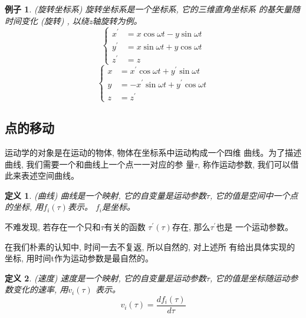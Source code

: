 \documentclass{ctexart}
\numberwithin{equation}{subsection}
\numberwithin{theorem}{subsection}
\newtheorem{definition} {定义}
\numberwithin{definition}{subsection}
\numberwithin{proof}{subsection}
\numberwithin{lemma}{subsection}
\newtheorem{example}    {例子}
\numberwithin{example}{subsection}
\numberwithin{remark}{subsection}
\numberwithin{corollary}{subsection}
\numberwithin{exercise}{subsection}
\numberwithin{problem}{subsection}
\numberwithin{question}{section}
\numberwithin{method}{subsection}
\begin{document}
    \begin{example}
        \label{1.1 ex:rotating frame}
        (旋转坐标系) 旋转坐标系是一个坐标系, 它的三维直角坐标系
        的基矢量随时间变化 (旋转) , 以绕z轴旋转为例。
        \begin{equation}
            \begin{cases}
                x ^ \prime &= x \cos\omega t - y \sin\omega t \\
                y ^ \prime &= x \sin\omega t + y \cos\omega t \\
                z ^ \prime &= z
            \end{cases}
        \end{equation}
        \begin{equation}
            \begin{cases}
                x &= x ^ \prime \cos\omega t + y ^ \prime \sin\omega t \\
                y &= -x ^ \prime \sin\omega t + y ^ \prime \cos\omega t \\
                z &= z ^ \prime
            \end{cases}
        \end{equation}
    \end{example}

    \subsection{点的移动}

    运动学的对象是在运动的物体, 物体在坐标系中运动构成一个四维
    曲线。为了描述曲线, 我们需要一个和曲线上一个点一一对应的参
    量\(\tau\), 称作运动参数, 我们可以借此来表述空间曲线。

    \begin{definition}
        \label{1.2 def:curve}
        (曲线) 曲线是一个映射, 它的自变量是运动参数\(\tau\),
        它的值是空间中一个点的坐标, 用\(f_i(\tau)\)表示。
        \(f_i\)是坐标。
    \end{definition}

    不难发现, 若存在一个只和\(\tau\)有关的函数
    \(\tau^\prime (\tau)\)存在, 那么\(\tau^\prime\)也是
    一个运动参数。

    在我们朴素的认知中, 时间一去不复返, 所以自然的, 对上述所
    有给出具体实现的坐标, 用时间t作为运动参数是最自然的。

    \begin{definition}
        \label{1.2 def:speed}
        (速度) 速度是一个映射, 它的自变量是运动参数\(\tau\),
        它的值是坐标随运动参数变化的速率, 用\(v_i(\tau)\)
        表示。
        \begin{equation}
            v_i(\tau) = \frac{d f_i(\tau)}{d \tau}
        \end{equation}
    \end{definition}
\end{document}
